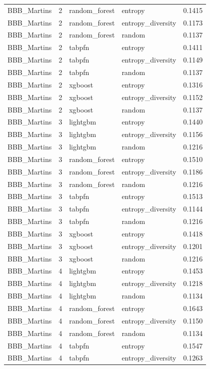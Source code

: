 \begin{tabular}{lrllr}
BBB_Martins & 2 & random_forest & entropy & 0.1415 \\
BBB_Martins & 2 & random_forest & entropy_diversity & 0.1173 \\
BBB_Martins & 2 & random_forest & random & 0.1137 \\
BBB_Martins & 2 & tabpfn & entropy & 0.1411 \\
BBB_Martins & 2 & tabpfn & entropy_diversity & 0.1149 \\
BBB_Martins & 2 & tabpfn & random & 0.1137 \\
BBB_Martins & 2 & xgboost & entropy & 0.1316 \\
BBB_Martins & 2 & xgboost & entropy_diversity & 0.1152 \\
BBB_Martins & 2 & xgboost & random & 0.1137 \\
BBB_Martins & 3 & lightgbm & entropy & 0.1440 \\
BBB_Martins & 3 & lightgbm & entropy_diversity & 0.1156 \\
BBB_Martins & 3 & lightgbm & random & 0.1216 \\
BBB_Martins & 3 & random_forest & entropy & 0.1510 \\
BBB_Martins & 3 & random_forest & entropy_diversity & 0.1186 \\
BBB_Martins & 3 & random_forest & random & 0.1216 \\
BBB_Martins & 3 & tabpfn & entropy & 0.1513 \\
BBB_Martins & 3 & tabpfn & entropy_diversity & 0.1144 \\
BBB_Martins & 3 & tabpfn & random & 0.1216 \\
BBB_Martins & 3 & xgboost & entropy & 0.1418 \\
BBB_Martins & 3 & xgboost & entropy_diversity & 0.1201 \\
BBB_Martins & 3 & xgboost & random & 0.1216 \\
BBB_Martins & 4 & lightgbm & entropy & 0.1453 \\
BBB_Martins & 4 & lightgbm & entropy_diversity & 0.1218 \\
BBB_Martins & 4 & lightgbm & random & 0.1134 \\
BBB_Martins & 4 & random_forest & entropy & 0.1643 \\
BBB_Martins & 4 & random_forest & entropy_diversity & 0.1150 \\
BBB_Martins & 4 & random_forest & random & 0.1134 \\
BBB_Martins & 4 & tabpfn & entropy & 0.1547 \\
BBB_Martins & 4 & tabpfn & entropy_diversity & 0.1263 \\

\end{tabular}
